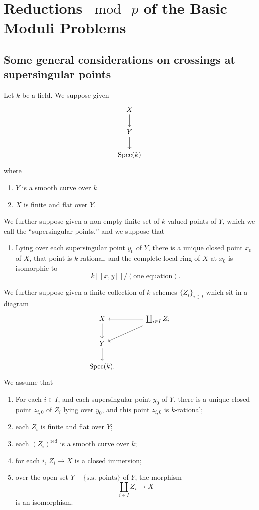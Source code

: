 \chapter{Reductions \texorpdfstring{$\bmod\ p$}{mod p} of the Basic Moduli Problems}
\label{ch:13}

\section{Some general considerations on crossings at supersingular points}
\label{sec:13.1}

\kmitem\label{item:13.1.1}
Let $k$ be a field. We suppose given
\[
\begin{tikzcd}[row sep=1.8em]
X \arrow[d] \\
Y \arrow[d] \\
\Spec(k)
\end{tikzcd}
\]
where
\begin{enumerate}[label=(\arabic*)]
\item $Y$ is a smooth curve over $k$
\item $X$ is finite and flat over $Y$.
\end{enumerate}
We further suppose given a non-empty finite set of $k$-valued points of $Y$, which we call the ``supersingular points,'' and we suppose that
\begin{enumerate}[label=(\arabic*), start=3]
\item Lying over each supersingular point $y_0$ of $Y$, there is a unique closed point $x_0$ of $X$, that point is $k$-rational, and the complete local ring of $X$ at $x_0$ is isomorphic to
\[
k[[x, y]]/(\text{one equation}) .
\]
\end{enumerate}
We further suppose given a finite collection of $k$-schemes $\{Z_i\}_{i \in I}$ which sit in a diagram
\[
\begin{tikzcd}[row sep=1.8em, column sep=large]
X \arrow[d] & \coprod_{i \in I} Z_i \arrow[l] \arrow[ld] \\
Y \arrow[d] & \\
\Spec(k) . &
\end{tikzcd}
\]
We assume that
\begin{enumerate}[label=(\arabic*), start=4]
\item For each $i \in I$, and each supersingular point $y_0$ of $Y$, there is a unique closed point $z_{i,0}$ of $Z_i$ lying over $y_0$, and this point $z_{i,0}$ is $k$-rational;
\item each $Z_i$ is finite and flat over $Y$;
\item each $(Z_i)^{\mathrm{red}}$ is a smooth curve over $k$;
\item for each $i$, $Z_i \to X$ is a closed immersion;
\item over the open set $Y - \{\text{s.s.\ points}\}$ of $Y$, the morphism
\[
\coprod_{i \in I} Z_i \to X
\]
is an isomorphism.
\end{enumerate}

